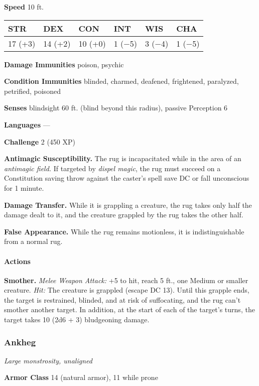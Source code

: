 \documentclass[
]{article}
\begin{document}
\textbf{Speed} 10 ft.

\begin{longtable}[]{@{}llllll@{}}
\toprule
STR & DEX & CON & INT & WIS & CHA\tabularnewline
\midrule
\endhead
17 (+3) & 14 (+2) & 10 (+0) & 1 (−5) & 3 (−4) & 1 (−5)\tabularnewline
\bottomrule
\end{longtable}

\textbf{Damage Immunities} poison, psychic

\textbf{Condition Immunities} blinded, charmed, deafened, frightened,
paralyzed, petrified, poisoned

\textbf{Senses} blindsight 60 ft. (blind beyond this radius), passive
Perception 6

\textbf{Languages} ---

\textbf{Challenge} 2 (450 XP)

\textbf{Antimagic Susceptibility.} The rug is incapacitated while in the
area of an \emph{antimagic field.} If targeted by \emph{dispel magic},
the rug must succeed on a Constitution saving throw against the caster's
spell save DC or fall unconscious for 1 minute.

\textbf{Damage Transfer.} While it is grappling a creature, the rug
takes only half the damage dealt to it, and the creature grappled by the
rug takes the other half.

\textbf{False Appearance.} While the rug remains motionless, it is
indistinguishable from a normal rug.

\hypertarget{actions-6}{%
\paragraph{Actions}\label{actions-6}}

\textbf{Smother.} \emph{Melee Weapon Attack:} +5 to hit, reach 5 ft.,
one Medium or smaller creature. \emph{Hit:} The creature is grappled
(escape DC 13). Until this grapple ends, the target is restrained,
blinded, and at risk of suffocating, and the rug can't smother another
target. In addition, at the start of each of the target's turns, the
target takes 10 (2d6 + 3) bludgeoning damage.

\hypertarget{ankheg}{%
\subsubsection{Ankheg}\label{ankheg}}

\emph{Large monstrosity, unaligned}

\textbf{Armor Class} 14 (natural armor), 11 while prone
\end{document}
